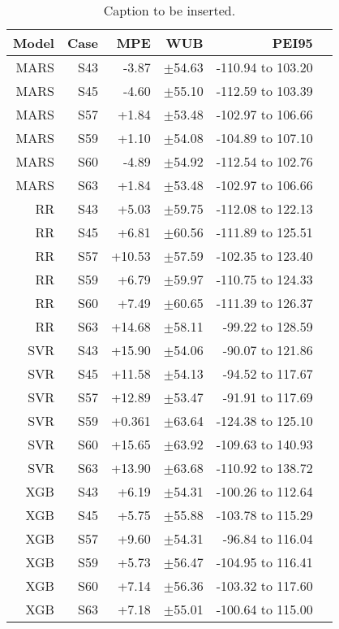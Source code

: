 \begin{table}
\centering
\caption{Caption to be inserted.}
\label{uncertainty_table__models}
\begin{tabular}{rrrrrr}
\toprule
Model & Case &    MPE &        WUB &             PEI95 \\
\midrule
 MARS &  S43 &  -3.87 & $\pm$54.63 & -110.94 to 103.20 \\
 MARS &  S45 &  -4.60 & $\pm$55.10 & -112.59 to 103.39 \\
 MARS &  S57 &  +1.84 & $\pm$53.48 & -102.97 to 106.66 \\
 MARS &  S59 &  +1.10 & $\pm$54.08 & -104.89 to 107.10 \\
 MARS &  S60 &  -4.89 & $\pm$54.92 & -112.54 to 102.76 \\
 MARS &  S63 &  +1.84 & $\pm$53.48 & -102.97 to 106.66 \\
   RR &  S43 &  +5.03 & $\pm$59.75 & -112.08 to 122.13 \\
   RR &  S45 &  +6.81 & $\pm$60.56 & -111.89 to 125.51 \\
   RR &  S57 & +10.53 & $\pm$57.59 & -102.35 to 123.40 \\
   RR &  S59 &  +6.79 & $\pm$59.97 & -110.75 to 124.33 \\
   RR &  S60 &  +7.49 & $\pm$60.65 & -111.39 to 126.37 \\
   RR &  S63 & +14.68 & $\pm$58.11 &  -99.22 to 128.59 \\
  SVR &  S43 & +15.90 & $\pm$54.06 &  -90.07 to 121.86 \\
  SVR &  S45 & +11.58 & $\pm$54.13 &  -94.52 to 117.67 \\
  SVR &  S57 & +12.89 & $\pm$53.47 &  -91.91 to 117.69 \\
  SVR &  S59 & +0.361 & $\pm$63.64 & -124.38 to 125.10 \\
  SVR &  S60 & +15.65 & $\pm$63.92 & -109.63 to 140.93 \\
  SVR &  S63 & +13.90 & $\pm$63.68 & -110.92 to 138.72 \\
  XGB &  S43 &  +6.19 & $\pm$54.31 & -100.26 to 112.64 \\
  XGB &  S45 &  +5.75 & $\pm$55.88 & -103.78 to 115.29 \\
  XGB &  S57 &  +9.60 & $\pm$54.31 &  -96.84 to 116.04 \\
  XGB &  S59 &  +5.73 & $\pm$56.47 & -104.95 to 116.41 \\
  XGB &  S60 &  +7.14 & $\pm$56.36 & -103.32 to 117.60 \\
  XGB &  S63 &  +7.18 & $\pm$55.01 & -100.64 to 115.00 \\
\bottomrule
\end{tabular}
\end{table}
